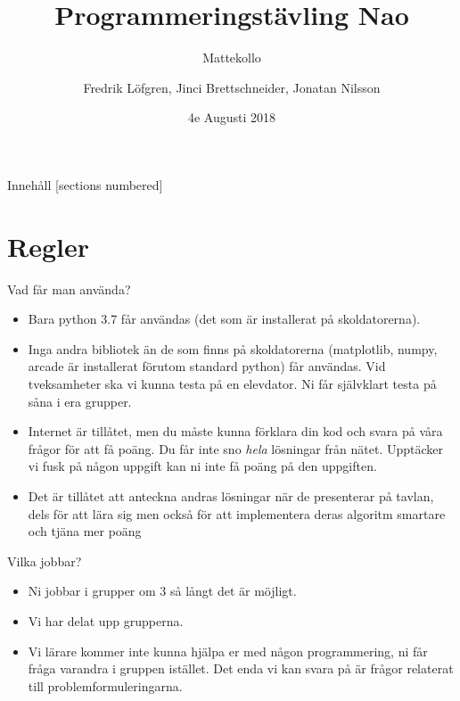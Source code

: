 \documentclass[10pt]{beamer}
\title{Programmeringstävling Nao}
\subtitle{Mattekollo}
\date{4e Augusti 2018}
\author{Fredrik Löfgren, Jinci Brettschneider, Jonatan Nilsson}
\begin{document}
\maketitle

\begin{frame}{Innehåll}
  [sections numbered]
  \tableofcontents[hideallsubsections]
\end{frame}

\section{Regler}

\begin{frame}[fragile]{Vad får man använda?}

\begin{itemize}
\item Bara python 3.7 får användas (det som är installerat på skoldatorerna).
\item Inga andra bibliotek än de som finns på skoldatorerna (matplotlib, numpy, arcade är installerat förutom standard python) får användas. Vid tveksamheter ska vi kunna testa på en elevdator. Ni får självklart testa på såna i era grupper. 
\item Internet är tillåtet, men du måste kunna förklara din kod och svara på våra frågor för att få poäng. Du får inte sno \emph{hela} lösningar från nätet. Upptäcker vi fusk på någon uppgift kan ni inte få poäng på den uppgiften. 
\item Det är tillåtet att anteckna andras lösningar när de presenterar på tavlan, dels för att lära sig men också för att implementera deras algoritm smartare och tjäna mer poäng
\end{itemize}
\end{frame}

\begin{frame}[fragile]{Vilka jobbar?}

\begin{itemize}
\item Ni jobbar i grupper om 3 så långt det är möjligt. 
\item Vi har delat upp grupperna. 
\item Vi lärare kommer inte kunna hjälpa er med någon programmering, ni får fråga varandra i gruppen istället. Det enda vi kan svara på är frågor relaterat till problemformuleringarna. 
\end{itemize}
\end{frame}
\end{document}
